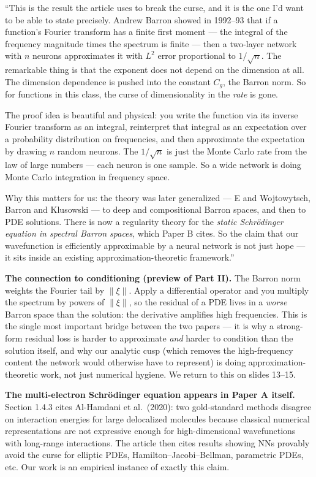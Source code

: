 \documentclass[11pt]{article}
\begin{document}
\begin{say}
``This is the result the article uses to break the curse, and it is the one I'd want to be able to
state precisely. Andrew Barron showed in 1992--93 that if a function's Fourier transform has a finite
first moment --- the integral of the frequency magnitude times the spectrum is finite --- then a
two-layer network with $n$ neurons approximates it with $L^2$ error proportional to $1/\sqrt n$. The
remarkable thing is that the exponent does not depend on the dimension at all. The dimension
dependence is pushed into the constant $C_g$, the Barron norm. So for functions in this class, the
curse of dimensionality in the \emph{rate} is gone.

The proof idea is beautiful and physical: you write the function via its inverse Fourier transform as
an integral, reinterpret that integral as an expectation over a probability distribution on
frequencies, and then approximate the expectation by drawing $n$ random neurons. The $1/\sqrt n$ is
just the Monte Carlo rate from the law of large numbers --- each neuron is one sample. So a wide
network is doing Monte Carlo integration in frequency space.

Why this matters for us: the theory was later generalized --- E and Wojtowytsch, Barron and
Klusowski --- to deep and compositional Barron spaces, and then to PDE solutions. There is now a
regularity theory for the \emph{static Schr\"odinger equation in spectral Barron spaces}, which
Paper B cites. So the claim that our wavefunction is efficiently approximable by a neural network is
not just hope --- it sits inside an existing approximation-theoretic framework.''
\end{say}

\begin{depth}
\textbf{The connection to conditioning (preview of Part II).} The Barron norm weights the Fourier
tail by $\|\xi\|$. Apply a differential operator and you multiply the spectrum by powers of
$\|\xi\|$, so the residual of a PDE lives in a \emph{worse} Barron space than the solution: the
derivative amplifies high frequencies. This is the single most important bridge between the two
papers --- it is why a strong-form residual loss is harder to approximate \emph{and} harder to
condition than the solution itself, and why our analytic cusp (which removes the high-frequency
content the network would otherwise have to represent) is doing approximation-theoretic work, not
just numerical hygiene. We return to this on slides 13--15.

\textbf{The multi-electron Schr\"odinger equation appears in Paper A itself.} Section 1.4.3 cites
Al-Hamdani et al.\ (2020): two gold-standard methods disagree on interaction energies for large
delocalized molecules because classical numerical representations are not expressive enough for
high-dimensional wavefunctions with long-range interactions. The article then cites results showing
NNs provably avoid the curse for elliptic PDEs, Hamilton--Jacobi--Bellman, parametric PDEs, etc.
Our work is an empirical instance of exactly this claim.
\end{depth}
\end{document}
